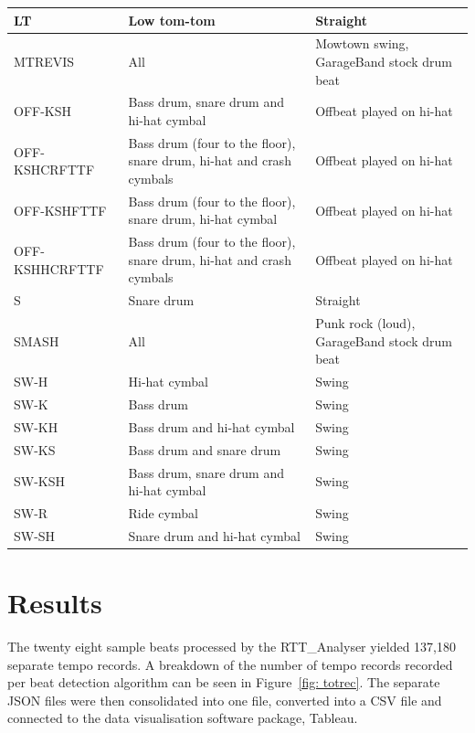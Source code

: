 \documentclass[a4paper, 11pt]{article}
\begin{document}
\begin{table}[htbp]
{\begin{tabular}{|p{3cm}|p{4cm}|l|}
\hline 
LT & Low tom-tom & Straight\\
\hline 
MTREVIS & All & Mowtown swing, GarageBand stock drum beat\\
\hline 
OFF-KSH & Bass drum, snare drum and hi-hat cymbal & Offbeat played on hi-hat\\
\hline 
OFF-KSHCRFTTF & Bass drum (four to the floor), snare drum, hi-hat and crash cymbals & Offbeat played on hi-hat\\
\hline 
OFF-KSHFTTF & Bass drum (four to the floor), snare drum, hi-hat cymbal & Offbeat played on hi-hat\\
\hline 
OFF-KSHHCRFTTF & Bass drum (four to the floor), snare drum, hi-hat and crash cymbals & Offbeat played on hi-hat\\
\hline 
S & Snare drum & Straight\\
\hline 
SMASH & All & Punk rock (loud), GarageBand stock drum beat\\
\hline 
SW-H & Hi-hat cymbal & Swing\\
\hline 
SW-K & Bass drum & Swing\\
\hline 
SW-KH & Bass drum and hi-hat cymbal & Swing\\
\hline 
SW-KS & Bass drum and snare drum & Swing\\
\hline 
SW-KSH & Bass drum, snare drum and hi-hat cymbal & Swing\\
\hline 
SW-R & Ride cymbal & Swing\\
\hline 
SW-SH & Snare drum and hi-hat cymbal & Swing\\
\hline
\end{tabular}}
\label{tab: beats}
\end{table}
\clearpage
\maketitle \section{Results}
The twenty eight sample beats processed by the RTT\_Analyser yielded 137,180 separate tempo records. A breakdown of the number of tempo records recorded per beat detection algorithm can be seen in Figure~\ref{fig: totrec}. The separate JSON files were then consolidated into one file, converted into a CSV file and connected to the data visualisation software package, Tableau\cite{tableau}.
\end{document}
